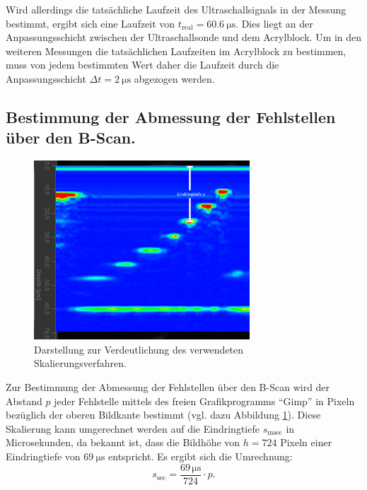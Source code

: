 Wird allerdings die tatsächliche Laufzeit des Ultraschallsignals in der Messung bestimmt, ergibt sich eine Laufzeit von ${t_\mathrm{real}=\SI{60.6}{\micro\second}}$. Dies liegt an der Anpassungsschicht zwischen der Ultraschallsonde und dem Acrylblock. Um in den weiteren Messungen die tatsächlichen Laufzeiten im Acrylblock zu bestimmen, muss von jedem bestimmten Wert daher die Laufzeit durch die Anpassungsschicht ${\Delta t=\SI{2}{\micro\second}}$ abgezogen werden.











\subsection{Bestimmung der Abmessung der Fehlstellen über den B-Scan.}
\label{sec:bscan}
\begin{figure}
  \centering
  \includegraphics[width=0.72\textwidth]{bscan/messverfahren}
  \caption{Darstellung zur Verdeutlichung des verwendeten Skalierungsverfahren.}
  \label{fig:messverfahren}
\end{figure}
Zur Bestimmung der Abmessung der Fehlstellen über den B-Scan wird der Abstand $p$ jeder Fehlstelle mittels des freien Grafikprogramms \enquote{Gimp} in Pixeln bezüglich der oberen Bildkante bestimmt (vgl. dazu Abbildung \ref{fig:messverfahren}).
Diese Skalierung kann umgerechnet werden auf die Eindringtiefe $s_\mathrm{msec}$ in Microsekunden, da bekannt ist, dass die Bildhöhe von $h=\num{724}$ Pixeln einer Eindringtiefe von $\SI{69}{\micro\second}$ entspricht.
Es ergibt sich die Umrechnung:
\begin{equation}
  s_\mathrm{sec}=\frac{69\, \si{\micro\second}}{724}\cdot p \text{.}
\end{equation}
